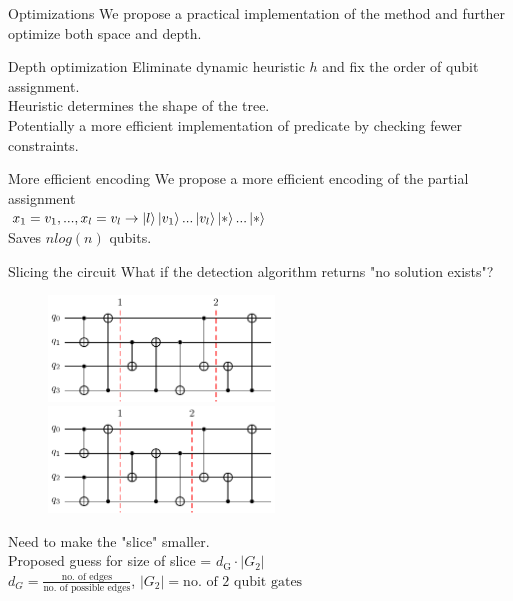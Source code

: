 \documentclass{beamer}
\begin{document}
\begin{frame}{Optimizations}
We propose a practical implementation of the method and further optimize both space and depth.\pause

\begin{block}{Depth optimization}\pause
	Eliminate dynamic heuristic $h$ and fix the order of qubit assignment. \pause \\
	Heuristic determines the shape of the tree.\pause \\
	Potentially a more efficient implementation of predicate by checking fewer constraints.
\end{block}\pause

\begin{alertblock}{More efficient encoding}\pause
	We propose a more efficient encoding of the partial assignment \pause \\
	$x_1 = v_1,...,x_l = v_l \rightarrow \ket{l}\ket{v_1}...\ket{v_l}\ket{*}...\ket{*}$ \pause \\
	Saves $nlog(n)$ qubits.
\end{alertblock}
\end{frame}

\begin{frame}{Slicing the circuit}
What if the detection algorithm returns "no solution exists"? \pause
\begin{figure}
	\centering
	\begin{overprint}
	\centering
		\includegraphics[height=80pt]{figures/wrong_sliced}
	\onslide<3->\centering
	\includegraphics[height=80pt]{figures/right_sliced}
	\end{overprint}
\end{figure} \pause
Need to make the "slice" smaller.\pause \\
Proposed guess for size of slice = $d_{\text{G}}\cdot \lvert G_2 \rvert$\\
$d_{G} = \frac{\text{no. of edges}}{\text{no. of possible edges}}$, $\lvert G_2 \rvert = \text{no. of 2 qubit gates}$

\end{frame}
\end{document}

